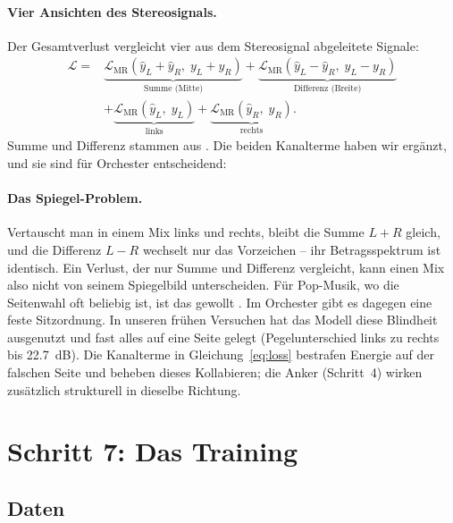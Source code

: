 \documentclass[11pt,a4paper]{article}
\begin{document}
\paragraph{Vier Ansichten des Stereosignals.} Der Gesamtverlust vergleicht vier
aus dem Stereosignal abgeleitete Signale:
\begin{equation}
  \begin{aligned}
  \mathcal{L} = {}&
  \underbrace{\mathcal{L}_{\text{MR}}(\hat y_L+\hat y_R,\; y_L+y_R)}_{\text{Summe (Mitte)}}
  + \underbrace{\mathcal{L}_{\text{MR}}(\hat y_L-\hat y_R,\; y_L-y_R)}_{\text{Differenz (Breite)}}\\
  &+ \underbrace{\mathcal{L}_{\text{MR}}(\hat y_L,\; y_L)}_{\text{links}}
  + \underbrace{\mathcal{L}_{\text{MR}}(\hat y_R,\; y_R)}_{\text{rechts}}.
  \end{aligned}
  \label{eq:loss}
\end{equation}
Summe und Differenz stammen aus \cite{steinmetz2021}. Die beiden Kanalterme
haben wir ergänzt, und sie sind für Orchester entscheidend:

\paragraph{Das Spiegel-Problem.} Vertauscht man in einem Mix links und
rechts, bleibt die Summe $L+R$ gleich, und die Differenz $L-R$ wechselt nur
das Vorzeichen -- ihr Betragsspektrum ist identisch. Ein Verlust, der nur Summe
und Differenz vergleicht, kann einen Mix also nicht von seinem Spiegelbild
unterscheiden. Für Pop-Musik, wo die Seitenwahl oft beliebig ist, ist das
gewollt \cite{steinmetz2021}. Im Orchester gibt es dagegen eine feste
Sitzordnung. In unseren frühen Versuchen hat das Modell diese Blindheit
ausgenutzt und fast alles auf eine Seite gelegt (Pegelunterschied links zu
rechts bis \SI{+22.7}{dB}). Die Kanalterme in Gleichung~\eqref{eq:loss}
bestrafen Energie auf der falschen Seite und beheben dieses Kollabieren; die
Anker (Schritt~4) wirken zusätzlich strukturell in dieselbe Richtung.

\section{Schritt 7: Das Training}
\label{sec:daten}

\subsection{Daten}
\end{document}
